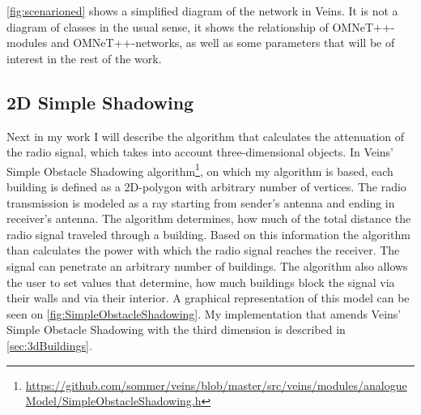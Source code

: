 \documentclass[]{nsm-thesis}
\begin{document}
\cref{fig:scenarioned} shows a simplified diagram of the network in Veins. It is not a diagram of classes in the usual sense, it shows the relationship of OMNeT++-modules and OMNeT++-networks, as well as some parameters that will be of interest in the rest of the work. 



\subsection{2D Simple Shadowing}

Next in my work I will describe the algorithm that calculates the attenuation of the radio signal, which takes into account three-dimensional objects. In Veins' Simple Obstacle Shadowing algorithm\footnote{\url{https://github.com/sommer/veins/blob/master/src/veins/modules/analogueModel/SimpleObstacleShadowing.h}}, on which my algorithm is based, each building is defined as a 2D-polygon with arbitrary number of vertices. The radio transmission is modeled as a ray starting from sender's antenna and ending in receiver's antenna. The algorithm determines, how much of the total distance the radio signal traveled through a building. Based on this information the algorithm than calculates the power with which the radio signal reaches the receiver. The signal can penetrate an arbitrary number of buildings. The algorithm also allows the user to set values that determine, how much buildings block the signal via their walls and via their interior. A graphical representation of this model can be seen on \cref{fig:SimpleObstacleShadowing}. My implementation that amends Veins' Simple Obstacle Shadowing with the third dimension is described in \cref{sec:3dBuildings}.
\end{document}
